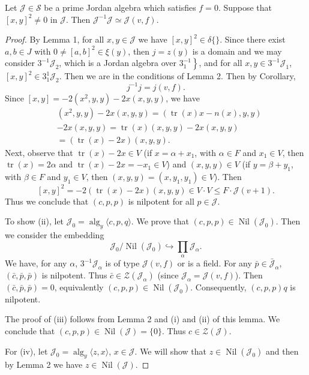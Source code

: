 \documentclass{article}
\begin{document}
\begin{theorem}
Let $\mathcal{J} \in \mathcal{S}$ be a prime Jordan algebra which satisfies $f=0$. Suppose that $[x,y]^2 \neq 0$ in $\mathcal{J}$. Then $\mathcal{J}^{-1}\mathcal{J} \simeq \mathcal{J}(v,f)$.
\end{theorem}

\begin{proof}
By Lemma 1, for all $x, y \in \mathcal{J}$ we have $[x, y]^2 \in \delta\{\}$. Since there exist $a, b \in J$ with $0 \neq [a, b]^2 \in \xi(y)$, then $j = z(y)$ is a domain and we may consider $3^{-1} \mathcal{J}_2$, which is a Jordan algebra over $\left.3_1^{-1}\right\}$, and for all $x, y \in 3^{-1} \mathcal{J}_1$, $[x, y]^2 \in 3_1^1 \mathcal{J}_2$. Then we are in the conditions of Lemma 2. Then by Corollary,
\[
j^{-1} j = j(v, f).
\]
Since $[x, y] = -2(x^2, y, y) - 2x(x, y, y)$, we have
\begin{align*}
& (x^2, y, y) - 2x(x, y, y) = (\operatorname{tr}(x)x - n(x), y, y) \\
& - 2x(x, y, y) = \operatorname{tr}(x)(x, y, y) - 2x(x, y, y) \\
& = (\operatorname{tr}(x) - 2x)(x, y, y).
\end{align*}
Next, observe that $\operatorname{tr}(x) - 2x \in V$ (if $x = \alpha + x_1$, with $\alpha \in F$ and $x_1 \in V$, then $\operatorname{tr}(x) = 2\alpha$ and $\operatorname{tr}(x) - 2x = -x_1 \in V$) and $(x, y, y) \in V$ (if $y = \beta + y_1$, with $\beta \in F$ and $y_1 \in V$, then $(x, y, y) = (x, y_1, y_1) \in V$). Then
\[
[x, y]^2 = -2(\operatorname{tr}(x) - 2x)(x, y, y) \in V \cdot V \leq F \cdot \mathcal{J}(v+1).
\]
Thus we conclude that $(c, p, p)$ is nilpotent for all $p \in \mathcal{J}$.

To show (ii), let $\mathcal{J}_0 = \operatorname{alg}_y\langle c, p, q\rangle$. We prove that $(c, p, p) \in \operatorname{Nil}(\mathcal{J}_0)$. Then we consider the embedding
\[
\mathcal{J}_0 / \operatorname{Nil}(\mathcal{J}_0) \hookrightarrow \prod_\alpha \mathcal{J}_\alpha.
\]
We have, for any $\alpha$, $3^{-1} \mathcal{J}_\alpha$ is of type $\mathcal{J}(v, f)$ or is a field. For any $\bar{p} \in \bar{\mathcal{J}}_\alpha$, $(\bar{c}, \bar{p}, \bar{p})$ is nilpotent. Thus $\bar{c} \in \mathcal{Z}(\mathcal{J}_\alpha)$ (since $\mathcal{J}_\alpha = \mathcal{J}(v, f)$). Then $(\bar{c}, \bar{p}, \bar{p}) = 0$, equivalently $(c, p, p) \in \operatorname{Nil}(\mathcal{J}_0)$. Consequently, $(c, p, p)q$ is nilpotent.

The proof of (iii) follows from Lemma 2 and (i) and (ii) of this lemma. We conclude that $(c, p, p) \in \operatorname{Nil}(\mathcal{J}) = \{0\}$. Thus $c \in \mathcal{Z}(\mathcal{J})$.

For (iv), let $\mathcal{J}_0 = \operatorname{alg}_y\langle z, x\rangle$, $x \in \mathcal{J}$. We will show that $z \in \operatorname{Nil}(\mathcal{J}_0)$ and then by Lemma 2 we have $z \in \operatorname{Nil}(\mathcal{J})$.
\end{proof}
\end{document}
